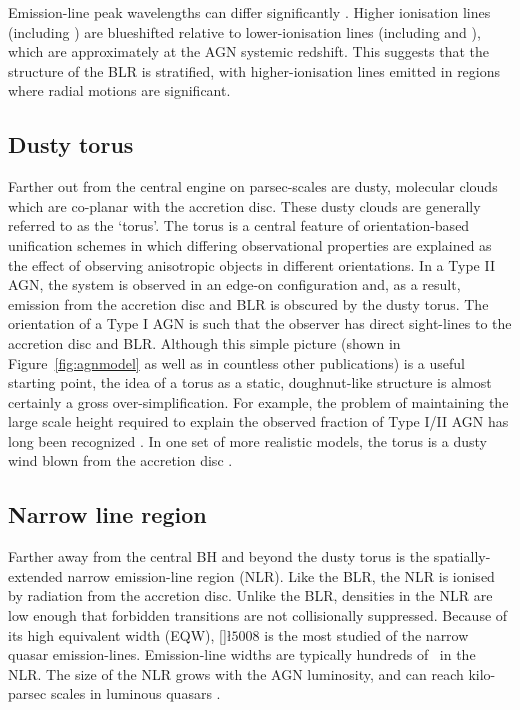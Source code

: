 Emission-line peak wavelengths can differ significantly \citep[e.g.][]{gaskell82}. 
Higher ionisation lines (including ) are blueshifted relative to lower-ionisation lines (including  and \hb), which are approximately at the AGN systemic redshift. 
This suggests that the structure of the BLR is stratified, with higher-ionisation lines emitted in regions where radial motions are significant.  

\subsection{Dusty torus}

Farther out from the central engine on parsec-scales are dusty, molecular clouds which are co-planar with the accretion disc. 
These dusty clouds are generally referred to as the `torus'. 
The torus is a central feature of orientation-based unification schemes \citep[e.g.][]{antonucci93} in which differing observational properties are explained as the effect of observing anisotropic objects in different orientations. 
In a Type II AGN, the system is observed in an edge-on configuration and, as a result, emission from the accretion disc and BLR is obscured by the dusty torus.
The orientation of a Type I AGN is such that the observer has direct sight-lines to the accretion disc and BLR. 
Although this simple picture (shown in Figure~\ref{fig:agnmodel} as well as in countless other publications) is a useful starting point, the idea of a torus as a static, doughnut-like structure is almost certainly a gross over-simplification. 
For example, the problem of maintaining the large scale height required to explain the observed fraction of Type I/II AGN has long been recognized \citep[e.g.][]{krolik88}. 
In one set of more realistic models, the torus is a dusty wind blown from the accretion disc \citep[e.g.][]{konigl94,everett09,gallagher12,everett05,keating12,elitzur06}. 

\subsection{Narrow line region}

Farther away from the central BH and beyond the dusty torus is the spatially-extended narrow emission-line region (NLR). 
Like the BLR, the NLR is ionised by radiation from the accretion disc. 
Unlike the BLR, densities in the NLR are low enough that forbidden transitions are not collisionally suppressed.
Because of its high equivalent width (EQW), []\l$5008$ is the most studied of the narrow quasar emission-lines.  
Emission-line widths are typically hundreds of \kms\, in the NLR.
The size of the NLR grows with the AGN luminosity, and can reach kilo-parsec scales in luminous quasars \citep[e.g.][]{hainline13}.    

